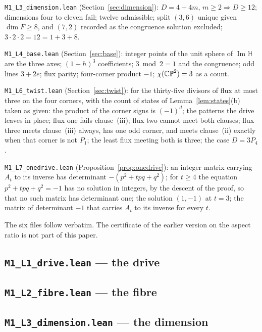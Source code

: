 \documentclass[11pt,a4paper]{article}
\theoremstyle{plain}
\theoremstyle{definition}
\theoremstyle{remark}
\newcommand{\Hquat}{\mathbb{H}}
\newcommand{\ImH}{\operatorname{Im}\Hquat}
\begin{document}
\texttt{M1\_L3\_dimension.lean} (Section~\ref{sec:dimension}): $D=4+4m$, $m\geq2\Rightarrow D\geq12$; dimensions four to eleven fail; twelve admissible; split $(3,6)$ unique given $\dim F\geq8$, and $(7,2)$ recorded as the congruence solution excluded; $3\cdot2\cdot2=12=1+3+8$.

\texttt{M1\_L4\_base.lean} (Section~\ref{sec:base}): integer points of the unit sphere of $\ImH$ are the three axes; $(1+h)^{3}$ coefficients; $3\bmod2=1$ and the congruence; odd lines $3+2e$; flux parity; four-corner product $-1$; $\chi(\mathbb{CP}^2)=3$ as a count.

\texttt{M1\_L6\_twist.lean} (Section~\ref{sec:twist}): for the thirty-five divisors of flux at most three on the four corners, with the count of states of Lemma~\ref{lem:states}(b) taken as given: the product of the corner signs is $(-1)^{d}$; the patterns the drive leaves in place; flux one fails clause~(iii); flux two cannot meet both clauses; flux three meets clause~(iii) always, has one odd corner, and meets clause~(ii) exactly when that corner is not $P_{1}$; the least flux meeting both is three; the case $D=3P_{4}$.

\texttt{M1\_L7\_onedrive.lean} (Proposition~\ref{prop:onedrive}): an integer matrix carrying $A_{t}$ to its inverse has determinant $-(p^{2}+tpq+q^{2})$; for $t\geq4$ the equation $p^{2}+tpq+q^{2}=-1$ has no solution in integers, by the descent of the proof, so that no such matrix has determinant one; the solution $(1,-1)$ at $t=3$; the matrix of determinant $-1$ that carries $A_{t}$ to its inverse for every $t$.

The six files follow verbatim. The certificate of the earlier version on the aspect ratio is not part of this paper.

\subsection*{\texttt{M1\_L1\_drive.lean} --- the drive}


\subsection*{\texttt{M1\_L2\_fibre.lean} --- the fibre}


\subsection*{\texttt{M1\_L3\_dimension.lean} --- the dimension}

\end{document}
